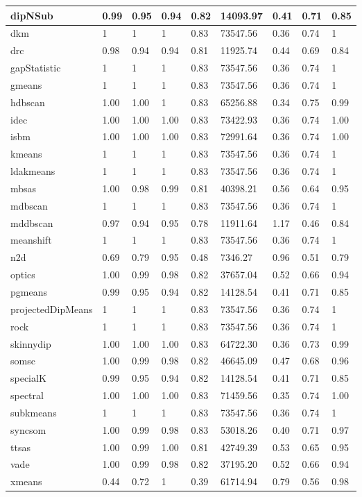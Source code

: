 \begin{table}[H]
\begin{tabular}{|l|l|l|l|l|l|l|l|l|}
\hline
dipNSub & 0.99 & 0.95 & 0.94 & 0.82 & 14093.97 & 0.41 & 0.71 & 0.85 \\
\hline
dkm & 1 & 1 & 1 & 0.83 & 73547.56 & 0.36 & 0.74 & 1 \\
\hline
drc & 0.98 & 0.94 & 0.94 & 0.81 & 11925.74 & 0.44 & 0.69 & 0.84 \\
\hline
gapStatistic & 1 & 1 & 1 & 0.83 & 73547.56 & 0.36 & 0.74 & 1 \\
\hline
gmeans & 1 & 1 & 1 & 0.83 & 73547.56 & 0.36 & 0.74 & 1 \\
\hline
hdbscan & 1.00 & 1.00 & 1 & 0.83 & 65256.88 & 0.34 & 0.75 & 0.99 \\
\hline
idec & 1.00 & 1.00 & 1.00 & 0.83 & 73422.93 & 0.36 & 0.74 & 1.00 \\
\hline
isbm & 1.00 & 1.00 & 1.00 & 0.83 & 72991.64 & 0.36 & 0.74 & 1.00 \\
\hline
kmeans & 1 & 1 & 1 & 0.83 & 73547.56 & 0.36 & 0.74 & 1 \\
\hline
ldakmeans & 1 & 1 & 1 & 0.83 & 73547.56 & 0.36 & 0.74 & 1 \\
\hline
mbsas & 1.00 & 0.98 & 0.99 & 0.81 & 40398.21 & 0.56 & 0.64 & 0.95 \\
\hline
mdbscan & 1 & 1 & 1 & 0.83 & 73547.56 & 0.36 & 0.74 & 1 \\
\hline
mddbscan & 0.97 & 0.94 & 0.95 & 0.78 & 11911.64 & 1.17 & 0.46 & 0.84 \\
\hline
meanshift & 1 & 1 & 1 & 0.83 & 73547.56 & 0.36 & 0.74 & 1 \\
\hline
n2d & 0.69 & 0.79 & 0.95 & 0.48 & 7346.27 & 0.96 & 0.51 & 0.79 \\
\hline
optics & 1.00 & 0.99 & 0.98 & 0.82 & 37657.04 & 0.52 & 0.66 & 0.94 \\
\hline
pgmeans & 0.99 & 0.95 & 0.94 & 0.82 & 14128.54 & 0.41 & 0.71 & 0.85 \\
\hline
projectedDipMeans & 1 & 1 & 1 & 0.83 & 73547.56 & 0.36 & 0.74 & 1 \\
\hline
rock & 1 & 1 & 1 & 0.83 & 73547.56 & 0.36 & 0.74 & 1 \\
\hline
skinnydip & 1.00 & 1.00 & 1.00 & 0.83 & 64722.30 & 0.36 & 0.73 & 0.99 \\
\hline
somsc & 1.00 & 0.99 & 0.98 & 0.82 & 46645.09 & 0.47 & 0.68 & 0.96 \\
\hline
specialK & 0.99 & 0.95 & 0.94 & 0.82 & 14128.54 & 0.41 & 0.71 & 0.85 \\
\hline
spectral & 1.00 & 1.00 & 1.00 & 0.83 & 71459.56 & 0.35 & 0.74 & 1.00 \\
\hline
subkmeans & 1 & 1 & 1 & 0.83 & 73547.56 & 0.36 & 0.74 & 1 \\
\hline
syncsom & 1.00 & 0.99 & 0.98 & 0.83 & 53018.26 & 0.40 & 0.71 & 0.97 \\
\hline
ttsas & 1.00 & 0.99 & 1.00 & 0.81 & 42749.39 & 0.53 & 0.65 & 0.95 \\
\hline
vade & 1.00 & 0.99 & 0.98 & 0.82 & 37195.20 & 0.52 & 0.66 & 0.94 \\
\hline
xmeans & 0.44 & 0.72 & 1 & 0.39 & 61714.94 & 0.79 & 0.56 & 0.98 \\
\hline
\end{tabular}
\end{table}